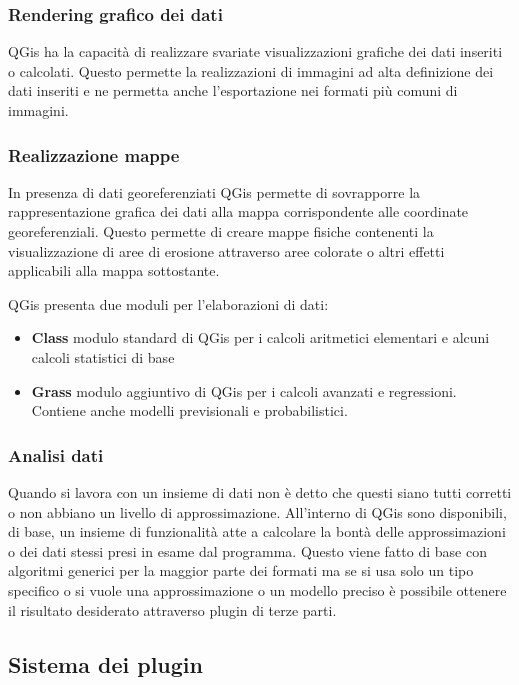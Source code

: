\subsubsection{Rendering grafico dei dati}
QGis ha la capacità di realizzare svariate visualizzazioni grafiche dei dati inseriti o calcolati.
Questo permette la realizzazioni di immagini ad alta definizione dei dati inseriti e ne permetta anche l'esportazione nei formati più comuni di immagini.

\subsubsection{Realizzazione mappe}
In presenza di dati georeferenziati QGis permette di sovrapporre la rappresentazione grafica dei dati alla mappa corrispondente alle coordinate georeferenziali.
Questo permette di creare mappe fisiche contenenti la visualizzazione di aree di erosione attraverso aree colorate o altri effetti applicabili alla mappa sottostante.

QGis presenta due moduli per l'elaborazioni di dati:
\begin{itemize}
	\item \textbf{Class} modulo standard di QGis per i calcoli aritmetici elementari e alcuni calcoli statistici di base
	\item \textbf{Grass} modulo aggiuntivo di QGis per i calcoli avanzati e regressioni. Contiene anche modelli previsionali e probabilistici.
\end{itemize}

\subsubsection{Analisi dati}
Quando si lavora con un insieme di dati non è detto che questi siano tutti corretti o non abbiano un livello di approssimazione.
All'interno di QGis sono disponibili, di base, un insieme di funzionalità atte a calcolare la bontà delle approssimazioni o dei dati stessi presi in esame dal programma.
Questo viene fatto di base con algoritmi generici per la maggior parte dei formati ma se si usa solo un tipo specifico o si vuole una approssimazione o un modello preciso è possibile ottenere il risultato desiderato attraverso plugin di terze parti.

\subsection{Sistema dei plugin}
